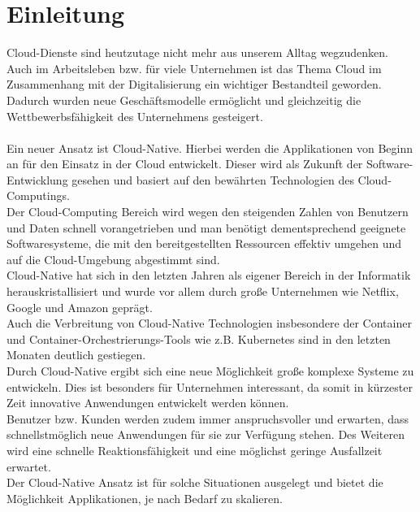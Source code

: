\chapter{Einleitung}
Cloud-Dienste sind heutzutage nicht mehr aus unserem Alltag wegzudenken. Auch im Arbeitsleben bzw. für viele Unternehmen ist das Thema Cloud im Zusammenhang mit der Digitalisierung ein wichtiger Bestandteil geworden. Dadurch wurden neue Geschäftsmodelle ermöglicht und gleichzeitig die Wettbewerbsfähigkeit des Unternehmens gesteigert.\\
\\
Ein neuer Ansatz ist Cloud-Native. Hierbei werden die Applikationen von Beginn an für den Einsatz in der Cloud entwickelt. Dieser wird als Zukunft der Software-Entwicklung gesehen und basiert auf den bewährten Technologien des Cloud-Computings.\\
Der Cloud-Computing Bereich wird wegen den steigenden Zahlen von Benutzern und Daten schnell vorangetrieben und man  benötigt dementsprechend geeignete Softwaresysteme, die mit den bereitgestellten Ressourcen effektiv umgehen und auf die Cloud-Umgebung abgestimmt sind.\\
Cloud-Native hat sich in den letzten Jahren als eigener Bereich in der Informatik herauskristallisiert und wurde vor allem durch große Unternehmen wie Netflix, Google und Amazon geprägt.\\
Auch die Verbreitung von Cloud-Native Technologien insbesondere der Container und Container-Orchestrierungs-Tools wie z.B. Kubernetes sind in den letzten Monaten deutlich gestiegen.\\
Durch Cloud-Native ergibt sich eine neue Möglichkeit große komplexe Systeme zu entwickeln. Dies ist besonders für Unternehmen interessant, da somit in kürzester Zeit innovative Anwendungen entwickelt werden können.\\
Benutzer bzw. Kunden werden zudem immer anspruchsvoller und erwarten, dass schnellstmöglich neue Anwendungen für sie zur Verfügung stehen. Des Weiteren wird eine schnelle Reaktionsfähigkeit und eine möglichst geringe Ausfallzeit erwartet.\\
Der Cloud-Native Ansatz ist für solche Situationen ausgelegt und bietet die Möglichkeit Applikationen, je nach Bedarf zu skalieren.\\
\\